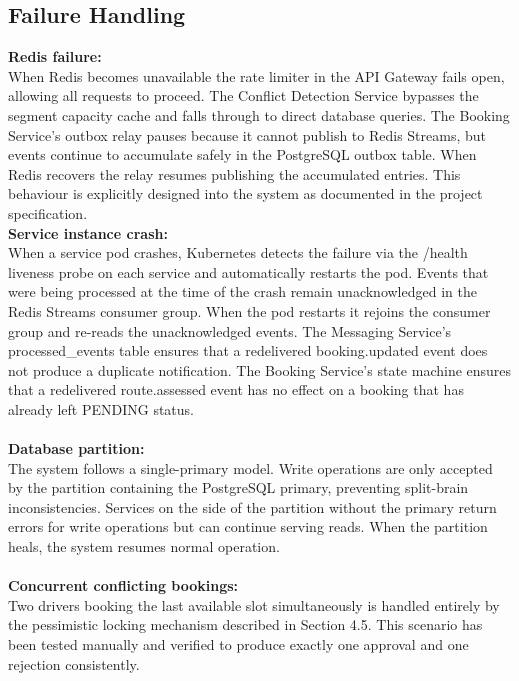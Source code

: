 \documentclass{article}
\begin{document}
\subsection{Failure Handling}
\textbf{Redis failure:}\\
When Redis becomes unavailable the rate limiter in the API Gateway fails open, allowing all requests to proceed. The Conflict Detection Service bypasses the segment capacity cache and falls through to direct database queries. The Booking Service's outbox relay pauses because it cannot publish to Redis Streams, but events continue to accumulate safely in the PostgreSQL outbox table. When Redis recovers the relay resumes publishing the accumulated entries. This behaviour is explicitly designed into the system as documented in the project specification.\\

\textbf{Service instance crash:}\\
When a service pod crashes, Kubernetes detects the failure via the /health liveness probe on each service and automatically restarts the pod. Events that were being processed at the time of the crash remain unacknowledged in the Redis Streams consumer group. When the pod restarts it rejoins the consumer group and re-reads the unacknowledged events. The Messaging Service's processed_events table ensures that a redelivered booking.updated event does not produce a duplicate notification. The Booking Service's state machine ensures that a redelivered route.assessed event has no effect on a booking that has already left PENDING status.
\\\\
\textbf{Database partition:}\\
The system follows a single-primary model. Write operations are only accepted by the partition containing the PostgreSQL primary, preventing split-brain inconsistencies. Services on the side of the partition without the primary return errors for write operations but can continue serving reads. When the partition heals, the system resumes normal operation.\\\\

\textbf{Concurrent conflicting bookings:}\\
Two drivers booking the last available slot simultaneously is handled entirely by the pessimistic locking mechanism described in Section 4.5. This scenario has been tested manually and verified to produce exactly one approval and one rejection consistently.
\end{document}
